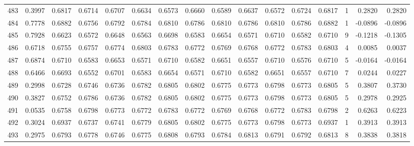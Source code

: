 \begin{tabular}{lrrrrrrrrrrrrrrr}
483 &      0.3997 &  0.6817 &  0.6714 &  0.6707 &  0.6634 &  0.6573 &  0.6660 &  0.6589 &  0.6637 &  0.6572 &   0.6724 &     0.6817 &      1 &                    0.2820 &                     0.2820 \\
484 &      0.7778 &  0.6882 &  0.6756 &  0.6792 &  0.6784 &  0.6810 &  0.6786 &  0.6810 &  0.6786 &  0.6810 &   0.6786 &     0.6882 &      1 &                   -0.0896 &                    -0.0896 \\
485 &      0.7928 &  0.6623 &  0.6572 &  0.6648 &  0.6563 &  0.6698 &  0.6583 &  0.6654 &  0.6571 &  0.6710 &   0.6582 &     0.6710 &      9 &                   -0.1218 &                    -0.1305 \\
486 &      0.6718 &  0.6755 &  0.6757 &  0.6774 &  0.6803 &  0.6783 &  0.6772 &  0.6769 &  0.6768 &  0.6772 &   0.6783 &     0.6803 &      4 &                    0.0085 &                     0.0037 \\
487 &      0.6874 &  0.6710 &  0.6583 &  0.6653 &  0.6571 &  0.6710 &  0.6582 &  0.6651 &  0.6557 &  0.6710 &   0.6576 &     0.6710 &      5 &                   -0.0164 &                    -0.0164 \\
488 &      0.6466 &  0.6693 &  0.6552 &  0.6701 &  0.6583 &  0.6654 &  0.6571 &  0.6710 &  0.6582 &  0.6651 &   0.6557 &     0.6710 &      7 &                    0.0244 &                     0.0227 \\
489 &      0.2998 &  0.6728 &  0.6746 &  0.6736 &  0.6782 &  0.6805 &  0.6802 &  0.6775 &  0.6773 &  0.6798 &   0.6773 &     0.6805 &      5 &                    0.3807 &                     0.3730 \\
490 &      0.3827 &  0.6752 &  0.6786 &  0.6736 &  0.6782 &  0.6805 &  0.6802 &  0.6775 &  0.6773 &  0.6798 &   0.6773 &     0.6805 &      5 &                    0.2978 &                     0.2925 \\
491 &      0.0535 &  0.6758 &  0.6798 &  0.6773 &  0.6772 &  0.6783 &  0.6772 &  0.6769 &  0.6768 &  0.6772 &   0.6783 &     0.6798 &      2 &                    0.6263 &                     0.6223 \\
492 &      0.3024 &  0.6937 &  0.6737 &  0.6741 &  0.6779 &  0.6805 &  0.6802 &  0.6775 &  0.6773 &  0.6798 &   0.6773 &     0.6937 &      1 &                    0.3913 &                     0.3913 \\
493 &      0.2975 &  0.6793 &  0.6778 &  0.6746 &  0.6775 &  0.6808 &  0.6793 &  0.6784 &  0.6813 &  0.6791 &   0.6792 &     0.6813 &      8 &                    0.3838 &                     0.3818 \\

\end{tabular}
